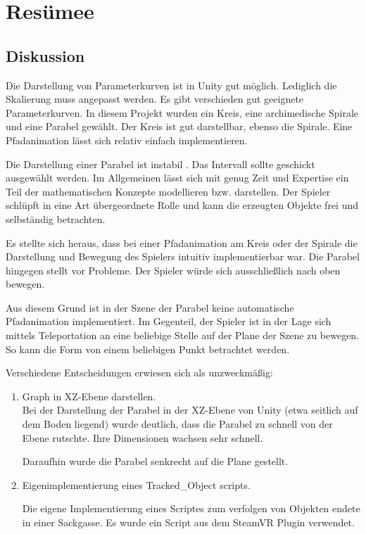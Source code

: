 
\chapter{Resümee}
\label{Resümee}

\section{Diskussion}
Die Darstellung von Parameterkurven ist in Unity gut möglich. Lediglich die Skalierung muss angepasst werden. Es gibt verschieden gut geeignete Parameterkurven. In diesem Projekt wurden ein Kreis, eine archimedische Spirale und eine Parabel gewählt.
Der Kreis ist gut darstellbar, ebenso die Spirale. Eine Pfadanimation lässt sich relativ einfach implementieren. 

Die Darstellung einer Parabel ist \glqq instabil \grqq{}. Das Intervall sollte geschickt ausgewählt werden. 
Im Allgemeinen lässt sich mit genug Zeit und Expertise ein Teil der mathematischen Konzepte modellieren bzw. darstellen. Der Spieler schlüpft in eine Art übergeordnete Rolle und kann die erzeugten Objekte frei und selbständig betrachten.

Es stellte sich heraus, dass bei einer Pfadanimation am Kreis oder der Spirale die Darstellung und Bewegung des Spielers intuitiv implementierbar war. 
Die Parabel hingegen stellt vor Probleme. Der Spieler würde sich ausschließlich nach oben bewegen.

Aus diesem Grund ist in der Szene der Parabel keine automatische Pfadanimation implementiert. Im Gegenteil, der Spieler ist in der Lage sich mittels Teleportation an eine beliebige Stelle auf der Plane der Szene zu bewegen. So kann die Form von einem beliebigen Punkt betrachtet werden.

Verschiedene Entscheidungen erwiesen sich als unzweckmäßig:
\begin{enumerate}
	\item Graph in XZ-Ebene darstellen. \\
			Bei der Darstellung der Parabel in der XZ-Ebene von Unity (\glqq etwa seitlich auf dem Boden liegend\grqq{}) wurde deutlich, dass die Parabel zu schnell von der Ebene rutschte. Ihre Dimensionen wachsen sehr schnell. 
		
			Daraufhin wurde die Parabel senkrecht auf die Plane gestellt.
	\item Eigenimplementierung eines Tracked\_Object scripts. 
	
	Die eigene Implementierung eines Scriptes zum verfolgen von Objekten endete in einer Sackgasse.
	Es wurde ein Script aus dem SteamVR Plugin verwendet.
\end{enumerate} 



